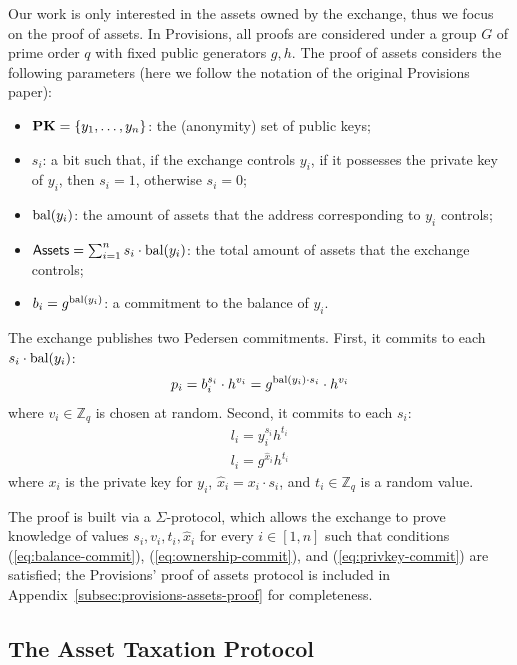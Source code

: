Our work is only interested in the assets owned by the exchange, thus we focus
on the proof of assets. In Provisions, all proofs are considered under a group
$G$ of prime order $q$ with fixed public generators $g, h$. The proof of assets
considers the following parameters (here we follow the notation of the original
Provisions paper):
\begin{itemize}
    \item $\text{\textbf{PK}} = \{y_1, \dots, y_n \}$: the (anonymity) set of public keys;
    \item $s_i$: a bit such that, if the exchange controls $y_i$, \ie if it possesses the private key of $y_i$, then $s_i = 1$, otherwise $s_i = 0$;
    \item $\text{bal}(y_i)$: the amount of assets that the address corresponding to $y_i$ controls;
    \item $\mathsf{Assets} = \sum_{i = 1}^n s_i \cdot \text{bal}(y_i)$: the total amount of assets that the exchange controls;
    \item $b_i = g^{\text{bal}(y_i)}$: a commitment to the balance of $y_i$.
\end{itemize}

The exchange publishes two Pedersen commitments. First, it commits to each $s_i
\cdot \text{bal}(y_i)$:
\begin{align}
    p_i = b_i^{s_i} \cdot h^{v_i} = g^{\text{bal}(y_i) \cdot s_i} \cdot h^{v_i} \label{eq:balance-commit}
\end{align}
where $v_i \in \mathbb{Z}_q$ is chosen at random.
Second, it commits to each $s_i$:
\begin{align}
    l_i = y_i^{s_i}h^{t_i} \label{eq:ownership-commit} \\
    l_i = g^{\hat{x}_i}h^{t_i} \label{eq:privkey-commit}
\end{align}
where $x_i$ is the private key for $y_i$, $\hat{x}_i = x_i \cdot s_i$, and $t_i
\in \mathbb{Z}_q$ is a random value.

The proof is built via a $\Sigma$-protocol, which allows the exchange to prove
knowledge of values $s_i, v_i, t_i, \hat{x}_i$ for every $i \in [1, n]$ such
that conditions (\ref{eq:balance-commit}), (\ref{eq:ownership-commit}), and
(\ref{eq:privkey-commit}) are satisfied; the Provisions' proof of assets
protocol is included in Appendix~\ref{subsec:provisions-assets-proof} for
completeness.

\subsection{The Asset Taxation Protocol}\label{subsec:tax-authority-proto}

